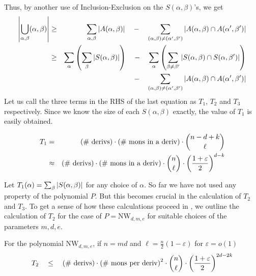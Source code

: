\documentclass[12pt]{report}
\newcommand{\NW}{\mathrm{NW}}
\renewcommand{\epsilon}{\varepsilon}
\begin{document}
Thus, by another use of Inclusion-Exclusion on the $S(\alpha, \beta)$'s, we get
\begin{eqnarray*}
\left|\bigcup_{\alpha, \beta}(\alpha,\beta)\right|&\geq& \sum_{\alpha,\beta}\left|A(\alpha, \beta)\right| \quad - \quad \sum_{(\alpha, \beta)\neq (\alpha',\beta')}\left|A(\alpha, \beta) \cap A(\alpha',\beta')\right|\\
 & \geq & \sum_\alpha \left(\sum_\beta \left|S(\alpha, \beta)\right|\right) \quad - \quad \sum_\alpha \left(\sum_{\beta \neq \beta'}\left|S(\alpha, \beta)\cap S(\alpha,\beta')\right|\right)\\
 & & \quad\quad \quad - \quad \sum_{(\alpha, \beta)\neq (\alpha',\beta')}\left|A(\alpha, \beta) \cap A(\alpha',\beta')\right|
\end{eqnarray*}
Let us call the three terms in the RHS of the last equation as $T_1$, $T_2$ and $T_3$ respectively. Since we know the size of each $S(\alpha, \beta)$ exactly, the value of $T_1$ is easily obtained. 
\begin{lemma}[\cite{KS14}]\label{lem:T_1-value}
\begin{eqnarray*}
T_1 &=& \text{(\# derivs)} \cdot \text{(\# mons in a deriv)} \cdot \binom{n-d+k}{\ell}\\
    & \approx & \text{(\# derivs)} \cdot \text{(\# mons in a deriv)} \cdot \binom{n}{\ell} \cdot \inparen{\frac{1+\epsilon}{2}}^{d-k}\\
\end{eqnarray*}
\end{lemma}
Let $T_1(\alpha) =\sum_\beta \left|S(\alpha, \beta)\right|$ for any choice of $\alpha$. 
So far we have not used any property of the polynomial $P$. But this becomes crucial in the calculation of $T_2$ and $T_3$. To get a sense of how these calculations proceed in \cite{KS14}, we outline the calculation of $T_2$ for the case of $P = \NW_{d,m,e}$ for suitable choices of the parameters $m,d,e$. 
\begin{lemma}[\cite{KS14}]\label{lem:T_2-for-NW}
For the polynomial $\NW_{d,m,e}$, if $n = md$ and $\ell = \frac{n}{2}(1 - \epsilon)$ for $\epsilon = o(1)$
\[
T_2 \quad \leq \quad\text{(\# derivs)} \cdot \text{(\# mons per deriv)}^2\cdot \binom{n}{\ell} \cdot \inparen{\frac{1+\epsilon}{2}}^{2d -2k}
\]
\end{lemma}
\end{document}
